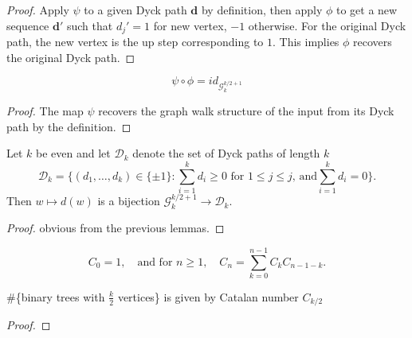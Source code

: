 \begin{proof}
  \notready
  Apply $\psi$ to a given Dyck path $\mathbf{d}$ by definition, then apply $\phi$ to get a new sequence
  $\mathbf{d}'$ such that $d_j' = 1$ for new vertex, $-1$ otherwise. For the original Dyck path, the new
  vertex is the up step corresponding to $1$. This implies $\phi$ recovers the original Dyck path.
\end{proof}


\begin{lemma}
  \notready
  \label{lem:composition2}
  $$\psi \circ \phi = id_{\mathcal{G}^{k/2 + 1}_k}$$
\end{lemma}

\begin{proof}
  \notready
  The map $\psi$ recovers the graph walk structure of the input from its Dyck path by the definition.
\end{proof}


\begin{lemma}
  \notready
  \label{lem:walk_to_Dyck_paths_bijection}
  Let $k$ be even and let $\mathcal{D}_k$ denote the set of Dyck paths of length $k$
  \[ \mathcal{D}_k = \{(d_1,\ldots,d_k)\in\{\pm 1\}\colon \sum_{i=1}^k d_i\ge 0\text{ for }1\le j\le j\text{, and}\sum_{i=1}^kd_i=0\}. \]
  Then $w\mapsto {d}(w)$ is a bijection $\mathcal{G}_k^{k/2+1}\to\mathcal{D}_k$.
\end{lemma}

\begin{proof}
  \notready
  obvious from the previous lemmas.
\end{proof}


\begin{definition}
  \mathlibok
  \label{def:Catalan_number}
  \[C_0 = 1, \quad \text{and for } n \geq 1, \quad C_n = \sum_{k=0}^{n-1} C_k C_{n-1-k}.\]
\end{definition}


\begin{lemma}
  \notready
  \label{lem:binary_tree_Catalan_number}
  \#\{binary trees with $\frac{k}{2}$ vertices\} is given by Catalan number $C_{k / 2}$
\end{lemma}

\begin{proof}
  \notready
\end{proof}


